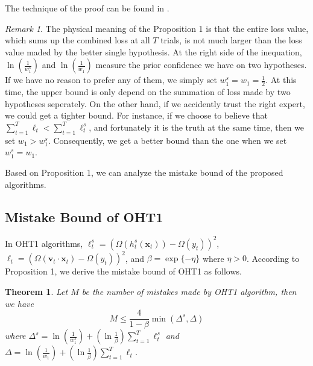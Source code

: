 \documentclass[letterpaper]{article}
\newtheorem{thm}{Theorem}
\theoremstyle{remark}
\newtheorem*{rem}{Remark}
\theoremstyle{definition}
\begin{document}
The technique of the proof can be found in \cite{freund1995decision}.
\begin{rem}
The physical meaning of the Proposition 1 is that the entire loss value, which sums up the combined loss at all $T$ trials, is not much larger than the loss value maded by the better single hypothesis.
At the right side of the inequation, $\ln(\frac{1}{w_{1}^{s}})$ and $\ln(\frac{1}{w_1})$ measure the prior confidence we have on two hypotheses.
If we have no reason to prefer any of them, we simply set $w_{1}^{s} = w_1 = \frac{1}{2}$.
At this time, the upper bound is only depend on the summation of loss made by two hypotheses seperately.
On the other hand, if we accidently trust the right expert, we could get a tighter bound.
For instance, if we choose to believe that $\sum\limits_{t=1}^{T} \ell_{t} < \sum\limits_{t=1}^{T} \ell_{t}^{s}$, and fortunately it is the truth at the same time, then we set $w_1 > w_{1}^{s}$.
Consequently, we get a better bound than the one when we set $w_{1}^{s} = w_{1}$.

Based on Proposition 1, we can analyze the mistake bound of the proposed algorithms.

\end{rem}

\subsection{Mistake Bound of OHT1}

In OHT1 algorithms, $\ell_{t}^{s} = (\varOmega(h_{t}^{s}(\mathbf{x}_t)) - \varOmega(y_t)) ^ 2$, $\ell_t = (\varOmega(\mathbf{v}_t \cdot \mathbf{x}_t) - \varOmega(y_t)) ^ 2$, and $\beta = \exp\{-\eta\}$ where $\eta > 0$.
According to Proposition 1, we derive the mistake bound of OHT1 as follows.

\begin{thm}
Let $M$ be the number of mistakes made by OHT1 algorithm, then we have 
$$ M \leq \frac{4}{1-\beta} \min (\varDelta^s, \varDelta) $$
where
$ \varDelta^s = \ln(\frac{1}{w_{1}^{s}}) + (\ln \frac{1}{\beta}) \sum\limits_{t=1}^{T} \ell_{t}^{s} $ and $ \varDelta = \ln(\frac{1}{w_{1}}) + (\ln \frac{1}{\beta}) \sum\limits_{t=1}^{T} \ell_{t} $.
\end{thm}
\end{document}
